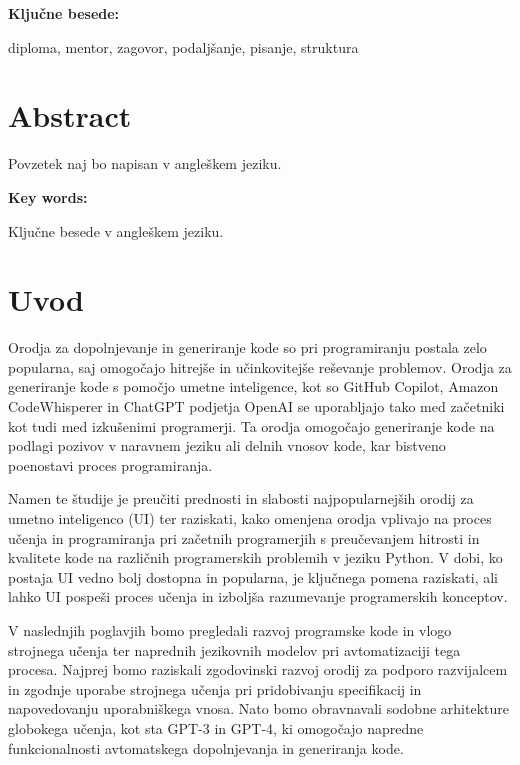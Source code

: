 \documentclass[12pt,a4paper]{book}
\begin{document}
\vspace{1.3cm}
\noindent
{\large \bf Ključne besede:}

\vspace{0.5cm}
\noindent
diploma, mentor, zagovor, podaljšanje, pisanje, struktura


\chapter*{Abstract}


Povzetek naj bo napisan v angleškem jeziku.

\vspace{1.3cm}
\noindent
{\large \bf Key words:}

\vspace{0.5cm}
\noindent
Ključne besede v angleškem jeziku.



\chapter{Uvod}

Orodja za dopolnjevanje in generiranje kode so pri programiranju postala zelo popularna, saj omogočajo hitrejše in učinkovitejše reševanje problemov. Orodja za generiranje kode s pomočjo umetne inteligence, kot so GitHub Copilot, Amazon CodeWhisperer in ChatGPT podjetja OpenAI se uporabljajo tako med začetniki kot tudi med izkušenimi programerji. Ta orodja omogočajo generiranje kode na podlagi pozivov v naravnem jeziku ali delnih vnosov kode, kar bistveno poenostavi proces programiranja.

Namen te študije je preučiti prednosti in slabosti najpopularnejših orodij za umetno inteligenco (UI) ter raziskati, kako omenjena orodja vplivajo na proces učenja in programiranja pri začetnih programerjih s preučevanjem hitrosti in kvalitete kode na različnih programerskih problemih v jeziku Python. V dobi, ko postaja UI vedno bolj dostopna in popularna, je ključnega pomena raziskati, ali lahko UI pospeši proces učenja in izboljša razumevanje programerskih konceptov.  

V naslednjih poglavjih bomo pregledali razvoj programske kode in vlogo strojnega učenja ter naprednih jezikovnih modelov pri avtomatizaciji tega procesa. Najprej bomo raziskali zgodovinski razvoj orodij za podporo razvijalcem in zgodnje uporabe strojnega učenja pri pridobivanju specifikacij in napovedovanju uporabniškega vnosa. Nato bomo obravnavali sodobne arhitekture globokega učenja, kot sta GPT-3 in GPT-4, ki omogočajo napredne funkcionalnosti avtomatskega dopolnjevanja in generiranja kode.
\end{document}
